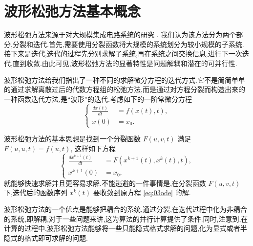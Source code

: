 \section{波形松弛方法基本概念}\label{sec:03wrintro}

波形松弛方法来源于对大规模集成电路系统的研究 \cite{lelarasmee1982waveform}. 我们认为该方法分为两个部分,分裂和迭代.首先,需要使用分裂函数将大规模的系统划分为较小规模的子系统.接下来是迭代,迭代的过程先分别求解子系统,再在系统之间交换信息,进行下一次迭代,直到收敛.由此可见,波形松弛方法的显著特性是问题解耦和潜在的可并行性.

波形松弛方法给我们指出了一种不同的求解微分方程的迭代方式.它不是简简单单的通过求解离散过后的代数方程组的松弛方法,而是通过对方程分裂而构造出来的一种函数迭代方法,是``波形''的迭代.考虑如下的一阶常微分方程
\begin{equation}\label{eq:03ode}
\left\{
\begin{aligned}
\frac{dx(t)}{dt}&=f(x(t),t),\\
x(0)&=x_{0}.
\end{aligned}
\right.
\end{equation}

波形松弛方法的基本思想是找到一个分裂函数 $F(u,v,t)$ 满足 $F(u,u,t)=f(u,t)$, 这样如下方程
\begin{equation*}
\left\{
\begin{aligned}
\frac{dx^{k+1}(t)}{dt}&=F(x^{k+1}(t),x^{k}(t),t),\\
x^{k+1}(0)&=x_{0},
\end{aligned}
\right.
\end{equation*}
就能够快速求解并且更容易求解.不能逃避的一件事情是,在分裂函数 $F(u,v,t)$ 下,迭代后的函数序列 $x^{k}(t)$ 要收敛到原方程 \eqref{eq:03ode} 的解.

波形松弛方法的一个优点是能够把耦合的系统,通过分裂,在迭代过程中化为非耦合的系统,即解耦,对于一些问题来讲,这为算法的并行计算提供了条件.同时,注意到,在计算的过程中,波形松弛方法能够将一些只能隐式格式求解的问题,化为显式或者半隐式的格式即可求解的问题.

